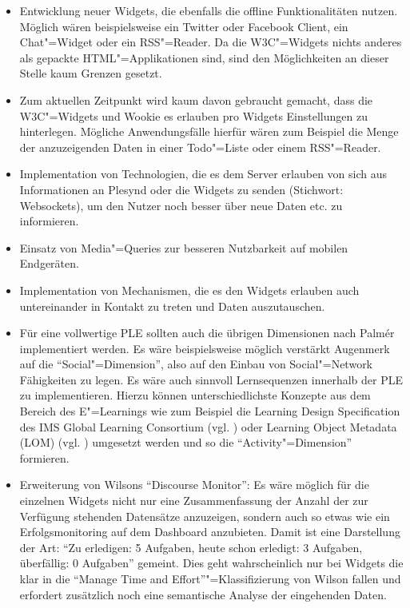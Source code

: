 \begin{itemize}
 \item Entwicklung neuer Widgets, die ebenfalls die offline Funktionalitäten nutzen. Möglich wären beispielsweise ein Twitter oder Facebook Client, ein Chat"=Widget oder ein \ac{RSS}"=Reader. Da die \ac{W3C}"=Widgets nichts anderes als gepackte \ac{HTML}"=Applikationen sind, sind den Möglichkeiten an dieser Stelle kaum Grenzen gesetzt.
 \item Zum aktuellen Zeitpunkt wird kaum davon gebraucht gemacht, dass die \ac{W3C}"=Widgets und Wookie es erlauben pro Widgets Einstellungen zu hinterlegen. Mögliche Anwendungsfälle hierfür wären zum Beispiel die Menge der anzuzeigenden Daten in einer Todo"=Liste oder einem \ac{RSS}"=Reader.
 \item Implementation von Technologien, die es dem Server erlauben von sich aus Informationen an Plesynd oder die Widgets zu senden (Stichwort: Websockets), um den Nutzer noch besser über neue Daten etc. zu informieren.
 \item Einsatz von Media"=Queries zur besseren Nutzbarkeit auf mobilen Endgeräten.
 \item Implementation von Mechanismen, die es den Widgets erlauben auch untereinander in Kontakt zu treten und Daten auszutauschen.
 \item Für eine vollwertige \ac{PLE} sollten auch die übrigen Dimensionen nach Palmér implementiert werden. Es wäre beispielsweise möglich verstärkt Augenmerk auf die "`Social"=Dimension"', also auf den Einbau von Social"=Network Fähigkeiten zu legen. Es wäre auch sinnvoll Lernsequenzen innerhalb der \ac{PLE} zu implementieren. Hierzu können unterschiedlichste Konzepte aus dem Bereich des E"=Learnings wie zum Beispiel die Learning Design Specification des IMS Global Learning Consortium (vgl. \cite{IMS2012}) oder Learning Object Metadata (LOM) (vgl. \cite{LOM2002}) umgesetzt werden und so die "`Activity"=Dimension"' formieren.
 \item Erweiterung von Wilsons "`Discourse Monitor"': Es wäre möglich für die einzelnen Widgets nicht nur eine Zusammenfassung der Anzahl der zur Verfügung stehenden Datensätze anzuzeigen, sondern auch so etwas wie ein Erfolgsmonitoring auf dem Dashboard anzubieten. Damit ist eine Darstellung der Art: "`Zu erledigen: 5 Aufgaben, heute schon erledigt: 3 Aufgaben, überfällig: 0 Aufgaben"' gemeint. Dies geht wahrscheinlich nur bei Widgets die klar in die “Manage Time and Effort”"=Klassifizierung von Wilson fallen und erfordert zusätzlich noch eine semantische Analyse der eingehenden Daten.
\end{itemize}

